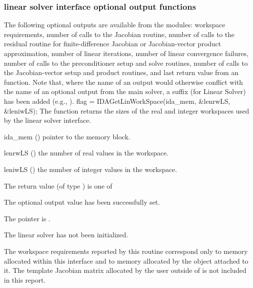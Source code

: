 {%
\subsubsection{{\idals} linear solver interface optional output functions}
\label{sss:optout_ls}
The following optional outputs are available from the {\idals} modules:
workspace requirements,
number of calls to the Jacobian routine,
number of calls to the residual routine for finite-difference Jacobian
or Jacobian-vector product approximation,
number of linear iterations,
number of linear convergence failures,
number of calls to the preconditioner setup and solve routines,
number of calls to the Jacobian-vector setup and product routines,
and last return value from an {\idals} function.
Note that, where the name of an output would otherwise conflict with
the name of an optional output from the main solver, a suffix 
(for Linear Solver) has been added (e.g., ).
{
  flag = IDAGetLinWorkSpace(ida\_mem, \&lenrwLS, \&leniwLS);
}
{
  The function  returns the sizes of the real and
  integer workspaces used by the {\idals} linear solver interface.
}
{
  \begin{args}
  \item[ida\_mem] ()
    pointer to the {\ida} memory block.
  \item[lenrwLS] ()
    the number of real values in the {\idals} workspace.
  \item[leniwLS] ()
    the number of integer values in the {\idals} workspace.
  \end{args}
}
{
  The return value  (of type ) is one of
  \begin{args}
  \item[\Id{IDALS\_SUCCESS}]
    The optional output value has been successfully set.
  \item[\Id{IDALS\_MEM\_NULL}]
    The  pointer is .
  \item[\Id{IDALS\_LMEM\_NULL}]
    The {\idals} linear solver has not been initialized.
  \end{args}
}
{
  The workspace requirements reported by this routine correspond only
  to memory allocated within this interface and to memory allocated by
  the {\sunlinsol} object attached to it.  The template Jacobian
  matrix allocated by the user outside of {\idals} is not included in
  this report.

}}
